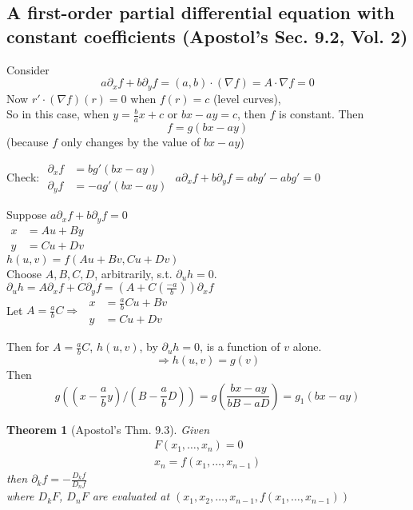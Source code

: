 \documentclass[twoside]{amsart}
\theoremstyle{plain}
\newtheorem{theorem}{Theorem}
\theoremstyle{definition}
\begin{document}
\subsection{ A first-order partial differential equation with constant coefficients (Apostol's Sec. 9.2, Vol. 2) }

Consider 
\[
a \partial_x f + b \partial_y f = (a,b) \cdot (\nabla f) = A \cdot \nabla f = 0 
\]
Now $r' \cdot (\nabla f)(r) = 0$ when $f(r) =c$ \quad (level curves), \smallskip \\
So in this case, when $y = \frac{b}{a}x + c$ or $bx-ay = c$, then $f$ is constant.  Then 
\[
f = g(bx-ay)
\]
(because $f$ only changes by the value of $bx-ay$)

Check: $\begin{aligned}
  \partial_x f & = bg'(bx-ay) \\
  \partial_y f & = -ag'(bx-ay)
\end{aligned}$ \quad \quad $a\partial_x f + b\partial_y f = abg' - abg' = 0 $

Suppose $a\partial_x f + b\partial_y f = 0$ \\
$\begin{aligned}
  x & = A u + By \\
  y & = C u + Dv 
\end{aligned}$ \\
$h(u,v) = f(Au + Bv, Cu + Dv)$ \smallskip \\
Choose $A,B,C,D$, arbitrarily, s.t. $\partial_u h = 0$.  $\partial_u h = A \partial_x f + C \partial_y f = (A + C\left( \frac{-a}{b} \right) ) \partial_x f$\medskip \\
Let $A = \frac{a}{b} C \Longrightarrow$ $\begin{aligned} x & = \frac{a}{b} C u + Bv \\ y & = Cu + Dv \end{aligned}$ 

Then for $A = \frac{a}{b} C$, $h(u,v)$, by $\partial_u h = 0$, is a function of $v$ alone.  
\[
\Longrightarrow h(u,v) = g(v)
\]
Then 
\[
g \left( (x-\frac{a}{b} y ) / (B- \frac{a}{b} D ) \right) = g \left( \frac{ bx - ay }{ bB - aD } \right) = g_1 \left( bx - ay\right)
\]

\begin{theorem}[Apostol's Thm. 9.3]
  Given 
\[
\begin{gathered}
  F(x_1,\dots, x_n) = 0 \\
  x_n = f(x_1,\dots, x_{n-1})
\end{gathered}
\]
then $\partial_k f = - \frac{ D_k f}{ D_n f }$ \\
where $D_k F$, $D_n F$ are evaluated at $(x_1,x_2, \dots, x_{n-1}, f(x_1, \dots, x_{n-1}) )$
\end{theorem}
\end{document}
